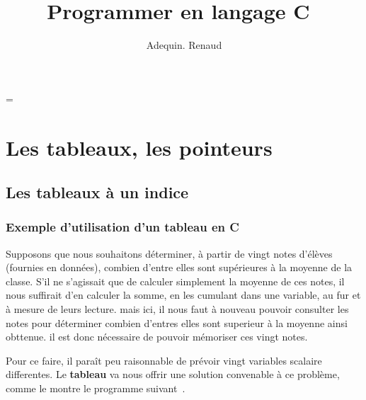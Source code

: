 \documentclass[a4paper]{report}
\author{Adequin. Renaud}
\title{Programmer en langage C~\cite{kr}}
\newcommand\Index[1]{#1\index{#1}}
\renewcommand{\emph}{\textbf}
\begin{document}
\maketitle

\newdimen\oldparindent\oldparindent=\parindent
\tableofcontents




\chapter{Les tableaux, les \Index{pointeurs}~\cite{delannoy}}

	\section{Les tableaux à un indice}
		\subsection{Exemple d'utilisation d'un tableau en C}
			Supposons que nous souhaitons déterminer, à partir de vingt notes d'élèves (fournies en données), combien d'entre elles sont supérieures à la moyenne de la classe. S'il ne s'agissait que de calculer simplement la moyenne de ces notes, il nous suffirait d'en calculer la somme, en les cumulant dans une variable, au fur et à mesure de leurs lecture. mais ici, il nous faut à nouveau pouvoir consulter les notes pour déterminer combien d'entres elles sont superieur à la moyenne ainsi obttenue. il est donc nécessaire de pouvoir mémoriser ces vingt notes.\par
			Pour ce faire, il paraît peu raisonnable de prévoir vingt variables scalaire differentes.
			Le \emph{\Index{tableau}} va nous offrir une solution convenable à ce problème, comme le montre le programme suivant~\cite{c20}.\\
\end{document}
